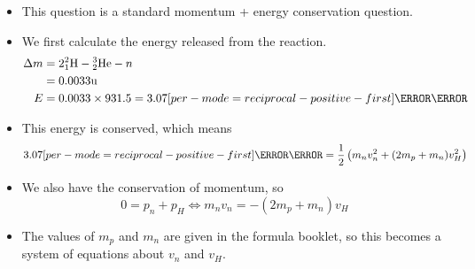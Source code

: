 \documentclass[a4paper,12pt]{article}
\let\oldsi\si
\renewcommand{\si}[1]{\oldsi[per-mode=reciprocal-positive-first]{#1}}
\newcommand{\atom}[3]{{}^{#1}_{#2}\text{#3}}
\begin{document}
\begin{itemize}
  \item This question is a standard momentum + energy conservation question.
  \item We first calculate the energy released from the reaction.
        \begin{align*}
          \Delta m & = 2\atom{2}{1}{H} - \atom{3}{2}{He} - n                      \\
                   & = 0.0033 \text{u}                                            \\
          E        & = 0.0033 \times 931.5                   = 3.07 \si{\mega\eV}
        \end{align*}
  \item This energy is conserved, which means
        $$3.07 \si{\mega\eV} = \frac{1}{2}\left(m_nv_n^2 + (2m_p + m_n)v_H^2\right)$$
  \item We also have the conservation of momentum, so $$0 = p_n + p_H \iff m_nv_n = -(2m_p + m_n)v_H$$
  \item The values of $m_p$ and $m_n$ are given in the formula booklet, so this becomes a system of equations about $v_n$ and $v_H$.
\end{itemize}
\end{document}
